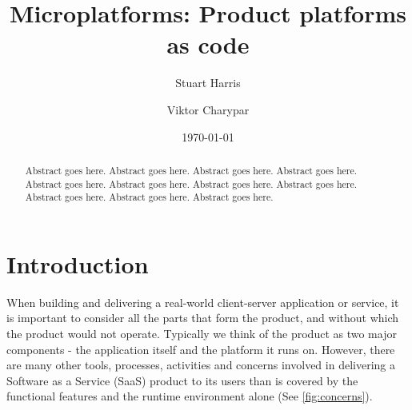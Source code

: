 \documentclass[reprint,amsmath,amssymb,aps]{revtex4-1}
\begin{document}

\title{Microplatforms: Product platforms as code}%

\author{Stuart Harris}
\author{Viktor Charypar}%

\date{\today}%

\begin{abstract}
Abstract goes here. Abstract goes here. Abstract goes here. Abstract goes here. Abstract goes here. 
Abstract goes here. Abstract goes here. Abstract goes here. Abstract goes here. Abstract goes here. Abstract goes here. 
\end{abstract}

\maketitle


\section{Introduction}
\label{sec:introduction}

When building and delivering a real-world client-server application or service, it is important to consider all the parts that form the product, and without which the product would not operate. Typically we think of the product as two major components - the application itself and the platform it runs on. However, there are many other tools, processes, activities and concerns involved in delivering a Software as a Service (SaaS) product to its users than is covered by the functional features and the runtime environment alone (See \ref{fig:concerns}). 
\end{document}
